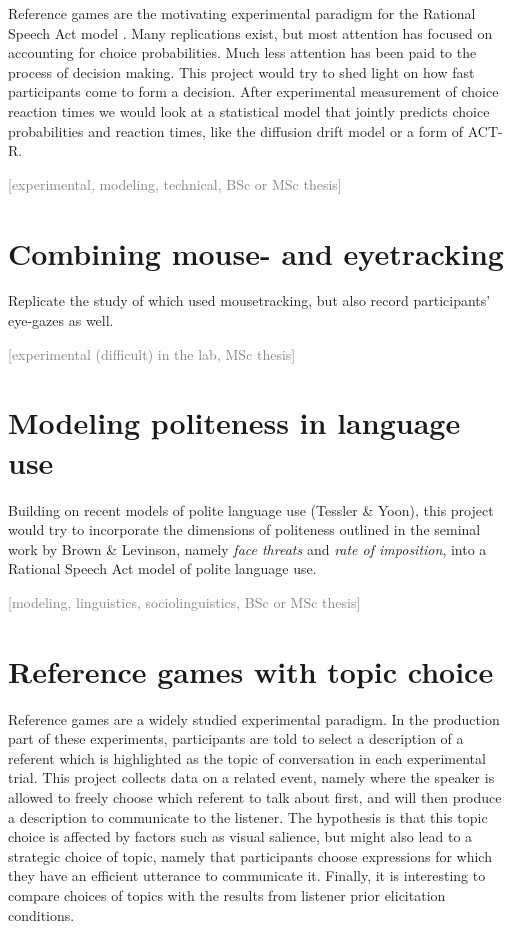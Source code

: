 \documentclass[fleqn,reqno,10pt]{article}
\newcommand{\scope}[1]{\hfill\textcolor{gray}{[#1]}}
\begin{document}
Reference games are the motivating experimental paradigm for the Rational Speech Act model \citep{GoodmanFrank2016:Pragmatic-Langu}. Many replications exist, but most attention has focused on accounting for choice probabilities. Much less attention has been paid to the process of decision making. This project would try to shed light on how fast participants come to form a decision. After experimental measurement of choice reaction times we would look at a statistical model that jointly predicts choice probabilities and reaction times, like the diffusion drift model \citep[e.g.][]{RatcliffMcKoon2008:The-Diffusion-D} or a form of ACT-R.

\scope{experimental, modeling, technical, BSc or MSc thesis}

\section{Combining mouse- and eyetracking}

Replicate the study of \citet{RoettgerFranke2018:Evidential-stre} which used mousetracking, but also record participants' eye-gazes as well.

\scope{experimental (difficult) in the lab, MSc thesis}

\section{Modeling politeness in language use}

Building on recent models of polite language use (Tessler \& Yoon), this project would try to incorporate the dimensions of politeness outlined in the seminal work by Brown \& Levinson, namely \emph{face threats} and \emph{rate of imposition}, into a Rational Speech Act model of polite language use.

\scope{modeling, linguistics, sociolinguistics, BSc or MSc thesis}

\section{Reference games with topic choice}

Reference games are a widely studied experimental paradigm. In the production part of these experiments, participants are told to select a description of a referent which is highlighted as the topic of conversation in each experimental trial. This project collects data on a related event, namely where the speaker is allowed to freely choose which referent to talk about first, and will then produce a description to communicate to the listener. The hypothesis is that this topic choice is affected by factors such as visual salience, but might also lead to a strategic choice of topic, namely that participants choose expressions for which they have an efficient utterance to communicate it. Finally, it is interesting to compare choices of topics with the results from listener prior elicitation conditions.
\end{document}
